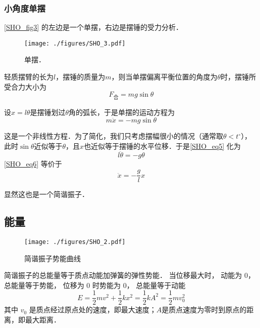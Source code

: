 \subsubsection{小角度单摆}

\autoref{SHO_fig3} 的左边是一个单摆，右边是摆锤的受力分析．

\begin{figure}[ht]
\centering
\texttt{[image: ./figures/SHO\_3.pdf]}
\caption{单摆．} \label{SHO_fig3}
\end{figure}

轻质摆臂的长为$l$，摆锤的质量为$m$，则当单摆偏离平衡位置的角度为$\theta$时，摆锤所受合力大小为
\begin{equation}
F_{\text{合}} = mg\sin\theta
\end{equation}

设$x=l\theta$是摆锤划过$\theta$角的弧长，于是单摆的运动方程为
\begin{equation}\label{SHO_eq5}
m\ddot{x} = -mg\sin\theta
\end{equation}

这是一个非线性方程．为了简化，我们只考虑摆幅很小的情况（通常取$\theta<t^\circ$），此时$\sin\theta$近似等于$\theta$，且$x$也近似等于摆锤的水平位移．于是\autoref{SHO_eq5} 化为
\begin{equation}\label{SHO_eq6}
l\ddot{\theta} = -g\theta
\end{equation}
\autoref{SHO_eq6} 等价于
\begin{equation}\label{SHO_eq7}
\ddot{x} = -\frac{g}{l}x
\end{equation}

显然这也是一个简谐振子．



\subsection{能量}

\begin{figure}[ht]
\centering
\texttt{[image: ./figures/SHO\_2.pdf]}
\caption{简谐振子势能曲线} \label{SHO_fig2}
\end{figure}

简谐振子的总能量等于质点动能加弹簧的弹性势能． 当位移最大时， 动能为 0， 总能量等于势能， 位移为 0 时势能为 0， 总能量等于动能
\begin{equation}
E = \frac{1}{2} mv^2 + \frac12 k x^2 = \frac12 k A^2 = \frac12 m v_0^2
\end{equation}
其中 $v_0$ 是质点经过原点处的速度，即最大速度；$A$是质点速度为零时到原点的距离，即最大距离．


